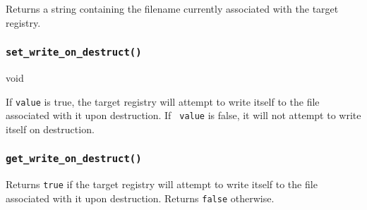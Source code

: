 
Returns a string containing the filename currently associated with the
target registry.


\subsubsection[set\_write\_on\_destruct]{{\tt set\_write\_on\_destruct()}}
\label{sec:registry:set_write}
void 

If {\tt value} is true, the target registry will attempt to write
itself to the file associated with it upon destruction.  If {\tt
value} is false, it will not attempt to write itself on destruction.


\subsubsection[get\_write\_on\_destruct]{{\tt get\_write\_on\_destruct()}}
\label{sec:registry:get_write}


Returns {\tt true} if the target registry will attempt to write itself
to the file associated with it upon destruction.  Returns {\tt false}
otherwise.
